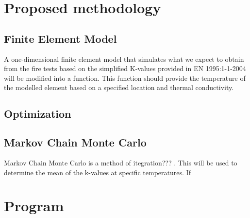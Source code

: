 \section{Proposed methodology}
	\subsection{Finite Element Model}
	A one-dimensional finite element model that simulates what we expect to obtain from the fire tests based on the simplified K-values provided in EN 1995:1-1-2004 will be modified into a function.
	 This function should provide the temperature of the modelled element based on a specified location and thermal conductivity.
	\subsection{Optimization}
	\subsection{Markov Chain Monte Carlo}
	Markov Chain Monte Carlo is a method of itegration??? . This will be used to determine the mean of the k-values at specific temperatures. If  
	
\section{Program}